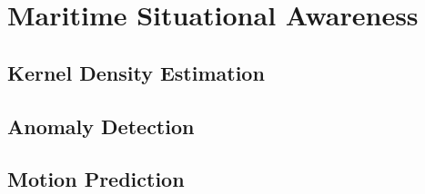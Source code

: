 \documentclass[bsc,frontabs,twoside,singlespacing,parskip,deptreport]{infthesis}     %
\begin{document}








\chapter{Maritime Situational Awareness}
\section{Kernel Density Estimation}
\section{Anomaly Detection}
\section{Motion Prediction}
\end{document}
